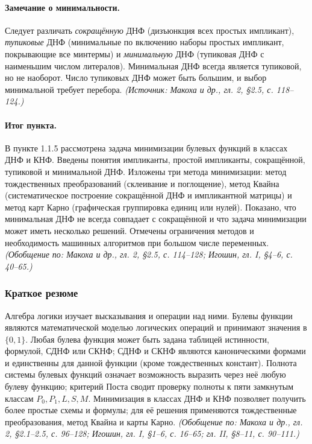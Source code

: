 \documentclass[a4paper,12pt]{article}
\begin{document}
\paragraph{Замечание о минимальности.}
Следует различать \emph{сокращённую} ДНФ (дизъюнкция всех простых импликант), \emph{тупиковые} ДНФ (минимальные по включению наборы простых импликант, покрывающие все минтермы) и \emph{минимальную} ДНФ (тупиковая ДНФ с наименьшим числом литералов). Минимальная ДНФ всегда является тупиковой, но не наоборот. Число тупиковых ДНФ может быть большим, и выбор минимальной требует перебора.
\textit{(Источник: Макоха и др., гл. 2, §2.5, с. 118--124.)}

\paragraph{Итог пункта.}
В пункте 1.1.5 рассмотрена задача минимизации булевых функций в классах ДНФ и КНФ. Введены понятия импликанты, простой импликанты, сокращённой, тупиковой и минимальной ДНФ. Изложены три метода минимизации: метод тождественных преобразований (склеивание и поглощение), метод Квайна (систематическое построение сокращённой ДНФ и импликантной матрицы) и метод карт Карно (графическая группировка единиц или нулей). Показано, что минимальная ДНФ не всегда совпадает с сокращённой и что задача минимизации может иметь несколько решений. Отмечены ограничения методов и необходимость машинных алгоритмов при большом числе переменных.
\textit{(Обобщение по: Макоха и др., гл. 2, §2.5, с. 114--128; Игошин, гл. I, §4--6, с. 40--65.)}

\subsubsection{Краткое резюме}

Алгебра логики изучает высказывания и операции над ними. Булевы функции являются математической моделью логических операций и принимают значения в \(\{0,1\}\). Любая булева функция может быть задана таблицей истинности, формулой, СДНФ или СКНФ; СДНФ и СКНФ являются каноническими формами и единственны для данной функции (кроме тождественных констант). Полнота системы булевых функций означает возможность выразить через неё любую булеву функцию; критерий Поста сводит проверку полноты к пяти замкнутым классам \(P_0,P_1,L,S,M\). Минимизация в классах ДНФ и КНФ позволяет получить более простые схемы и формулы; для её решения применяются тождественные преобразования, метод Квайна и карты Карно.
\textit{(Обобщение по: Макоха и др., гл. 2, §2.1--2.5, с. 96--128; Игошин, гл. I, §1--6, с. 16--65; гл. II, §8--11, с. 90--111.)}
\end{document}
